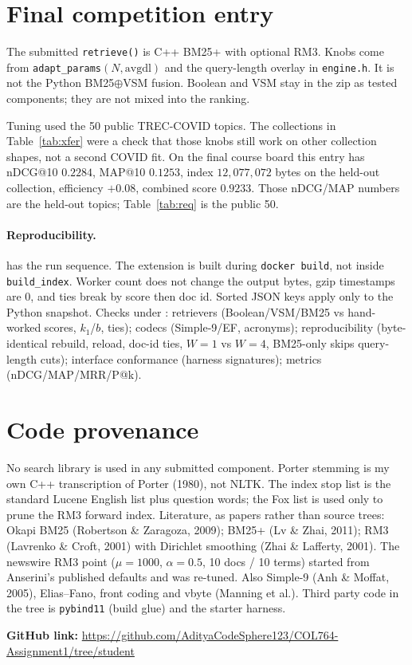 \documentclass[10pt,a4paper]{article}
\begin{document}
\section{Final competition entry}
The submitted \texttt{retrieve()} is C++ BM25+ with optional RM3. Knobs come from
\texttt{adapt\_params}$(N,\mathrm{avgdl})$ and the query-length overlay in
\texttt{engine.h}. It is not the Python BM25$\oplus$VSM fusion. Boolean and VSM stay
in the zip as tested components; they are not mixed into the ranking.

Tuning used the 50 public TREC-COVID topics. The collections in
Table~\ref{tab:xfer} were a check that those knobs still work on other collection
shapes, not a second COVID fit. On the final course board this entry has
nDCG@10 $0.2284$, MAP@10 $0.1253$, index $12{,}077{,}072$ bytes on the
held-out collection,
efficiency ${+}0.08$, combined score $0.9233$. Those nDCG/MAP numbers are the
held-out topics; Table~\ref{tab:req} is the public 50.

\paragraph{Reproducibility.}  has the run sequence. The extension is
built during \texttt{docker build}, not inside \texttt{build\_index}. Worker count
does not change the output bytes, gzip timestamps are 0, and ties break by score
then doc id. Sorted JSON keys apply only to the Python  snapshot.
Checks under : retrievers (Boolean/VSM/BM25 vs hand-worked scores,
$k_1$/$b$, ties); codecs (Simple-9/EF, acronyms); reproducibility (byte-identical
rebuild, reload, doc-id ties, $W{=}1$ vs $W{=}4$, BM25-only skips query-length
cuts); interface conformance (harness signatures); metrics (nDCG/MAP/MRR/P@k).

\section*{Code provenance}
No search library is used in any submitted component. Porter stemming is my own
C++ transcription of Porter (1980), not NLTK. The index stop list is the standard
Lucene English list plus question words; the Fox list is used only to prune the
RM3 forward index. Literature, as papers rather than source trees: Okapi BM25
(Robertson \& Zaragoza, 2009); BM25+ (Lv \& Zhai, 2011); RM3 (Lavrenko \& Croft,
2001) with Dirichlet smoothing (Zhai \& Lafferty, 2001). The newswire RM3 point
($\mu{=}1000$, $\alpha{=}0.5$, 10 docs / 10 terms) started from Anserini's
published defaults and was re-tuned. Also Simple-9 (Anh \& Moffat, 2005),
Elias--Fano, front coding and vbyte (Manning et al.). Third party code in the
tree is \texttt{pybind11} (build glue) and the starter harness.

\noindent\textbf{GitHub link:} \url{https://github.com/AdityaCodeSphere123/COL764-Assignment1/tree/student}
\end{document}
